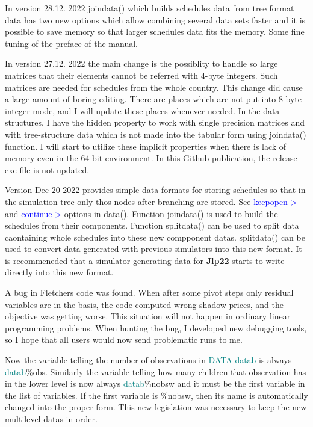 In version 28.12. 2022 \textcolor{VioletRed}{joindata}() which builds schedules data from tree format data has two new options 
which allow combining several data sets faster and it is possible to save memory so that larger 
schedules data fits the memory. Some fine tuning of the preface of the manual. 
 
In version 27.12. 2022 the main change is the possiblity to handle so large matrices that their 
elements cannot be referred with 4-byte integers. Such matrices are needed for schedules from the whole 
country. This change did cause a large amount of boring editing. 
There are places which are not put into 8-byte integer mode, and I will update 
these places whenever needed. 
In the data structures, I have the hidden property to work with single precision matrices and with tree-structure 
data which is not made into the tabular form using \textcolor{VioletRed}{joindata}() function. I will start to 
utilize these implicit properties when there is lack of memory even in the 64-bit environment. 
In this Github publication, 
the release exe-file is not updated. 
 
Version Dec 20 2022 provides simple data formats for storing schedules so that in the simulation tree only thos 
nodes after branching are stored. See \textcolor{blue}{keepopen->} and \textcolor{blue}{continue->} options in \textcolor{VioletRed}{data}(). Function \textcolor{VioletRed}{joindata}() is 
used to build the schedules from their components. Function \textcolor{VioletRed}{splitdata}() can be used to split data caontaining whole 
schedules into these new compponent datas. \textcolor{VioletRed}{splitdata}() can be used to convert data generated with previous simulators 
into this new format. It is recommeneded that a simulator generating data for \textbf{Jlp22} 
starts to write directly into this new format. 
 
A bug in Fletchers code was found. When after some pivot steps only residual variables 
are in the basis, the code computed wrong shadow prices, and the objective was getting worse. 
This situation will not happen in ordinary linear programming problems. When hunting the bug, I developed new 
debugging tools, so I hope that all users would now send problematic 
runs to me. 
 
Now the variable telling the number of observations in \textcolor{teal}{DATA} \textcolor{teal}{datab} is always \textcolor{teal}{datab}\%obs. 
Similarly the variable 
telling how many children that observation has in the lower level 
is now always \textcolor{teal}{datab}\%nobsw and it must be the 
first variable in the list of variables. If the first variable is \%nobsw, then its name is automatically 
changed into the proper form. This new legislation was necessary to keep the new multilevel 
datas in order. 
 
